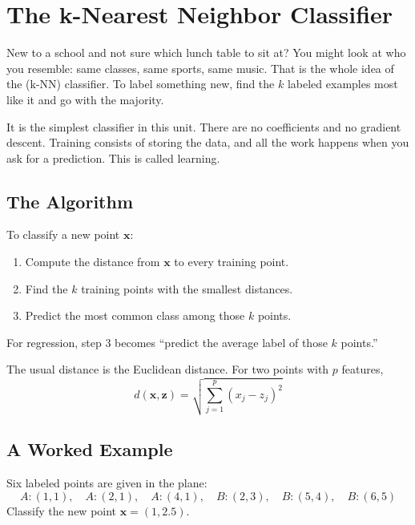 \chapter{The k-Nearest Neighbor Classifier}

New to a school and not sure which lunch table to sit at? You might look at who you resemble: same classes,
same sports, same music. That is the whole idea of the 
(k-NN) classifier. To label something new, find the $k$ labeled examples most like it and go with the majority.

It is the simplest classifier in this unit. There are no coefficients and no gradient descent. Training
consists of storing the data, and all the work happens when you ask for a prediction. This is called
 learning.

\section{The Algorithm}
To classify a new point $\mathbf{x}$:
\begin{enumerate}
\item Compute the distance from $\mathbf{x}$ to every training point.
\item Find the $k$ training points with the smallest distances.
\item Predict the most common class among those $k$ points.
\end{enumerate}
For regression, step 3 becomes ``predict the average label of those $k$ points.''

The usual distance is the Euclidean distance. For two points with $p$ features,
$$d(\mathbf{x}, \mathbf{z}) = \sqrt{\sum_{j=1}^{p}(x_j - z_j)^2}$$

\section{A Worked Example}
Six labeled points are given in the plane:
$$A: (1,1), \quad A: (2,1), \quad A: (4,1), \quad B: (2,3), \quad B: (5,4), \quad B: (6,5)$$
Classify the new point $\mathbf{x} = (1, 2.5)$.

